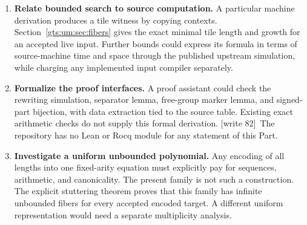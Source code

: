 \documentclass[11pt,letterpaper]{article}
\theoremstyle{definition}
\theoremstyle{remark}
\newcommand{\Z}{\mathbb Z}
\newcommand{\SL}{\operatorname{SL}}
\newcommand{\hto}{\mathrel{\longrightarrow}}
\newcommand{\wtagc}{\textup{[write 82]}}
\begin{document}
\begin{enumerate}
\wtagc\ (3~October 2026.) Question~4 is answered in part in the repository, on the day the archive arrived. The research programme's review~\cite{repo-revmg} reconstructed all 229 matrices and derived a subset of 197: delete the copy tiles of the fifteen state letters and of $X$, with their paired generators $A_i,B_i$. On a valid input every copied context consists of $0,1,[,]$, so the forward direction of Lemma~\ref{gts:um:lem:tiles} survives, and the subset semigroup has the same target map and the same halting equivalence on valid inputs, hence the same conditional r.e.-completeness; the all-word equivalence of Lemma~\ref{gts:um:lem:tiles} is not preserved. The successor note~\cite{repo-ds193} uses the terminal word $[J1]$ in place of $X$, with the four cleanup rules $0J1\hto J1$, $J10\hto J1$, $1J1\hto J1$, $J11\hto J1$ and the 87 machine rules (91 rewrites and 96 tiles), and obtains 193 literal generators in $\SL_4(\Z)$; the accepting example of Section~\ref{gts:um:sec:examples} then needs 12 rewrites, 83 tiles and 167 generator factors. Its largest entry grows from 26 to 31 magnitude bits, while the total of entry bit lengths falls from 21,372 to 19,321. Neither note claims minimality, an inverse-closed alphabet or a Diophantine gate bound, and both keep the Neary--Woods dependency. They are not printed here, and the shipped files are source~08's.
\item \textbf{Relate bounded search to source computation.} A particular machine derivation produces a tile witness by copying contexts. Section~\ref{gts:um:sec:fibers} gives the exact minimal tile length and growth for an accepted live input. Further bounds could express its formula in terms of source-machine time and space through the published upstream simulation, while charging any implemented input compiler separately.
\item \textbf{Formalize the proof interfaces.} A proof assistant could check the rewriting simulation, separator lemma, free-group marker lemma, and signed-part bijection, with data extraction tied to the source table. Existing exact arithmetic checks do not supply this formal derivation.
\wtagc\ The repository has no Lean or Rocq module for any statement of this Part.
\item \textbf{Investigate a uniform unbounded polynomial.} Any encoding of all lengths into one fixed-arity equation must explicitly pay for sequences, arithmetic, and canonicality. The present family is not such a construction. The explicit stuttering theorem proves that this family has infinite unbounded fibers for every accepted encoded target. A different uniform representation would need a separate multiplicity analysis.

\end{enumerate}
\end{document}
